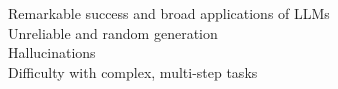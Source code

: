 \documentclass[preview]{standalone}
\begin{document}
Remarkable success and broad applications of LLMs\\Unreliable and random generation\\Hallucinations\\Difficulty with complex, multi-step tasks\\
\end{document}
